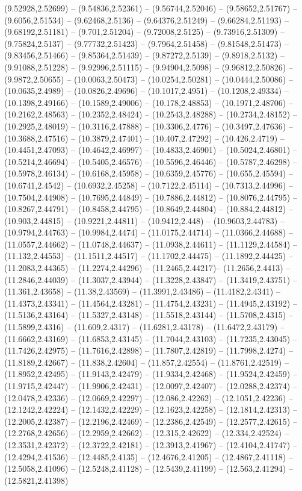 {(9.52928,2.52699) -- (9.54836,2.52361) -- (9.56744,2.52046) -- (9.58652,2.51767) -- (9.6056,2.51534) -- (9.62468,2.5136) -- (9.64376,2.51249) -- (9.66284,2.51193) -- (9.68192,2.51181) -- (9.701,2.51204) -- (9.72008,2.5125) -- (9.73916,2.51309) -- (9.75824,2.5137) -- (9.77732,2.51423) -- (9.7964,2.51458) -- (9.81548,2.51473) -- (9.83456,2.51466) -- (9.85364,2.51439) -- (9.87272,2.5139) -- (9.8918,2.5132) -- (9.91088,2.51228) -- (9.92996,2.51115) -- (9.94904,2.5098) -- (9.96812,2.50826) -- (9.9872,2.50655) -- (10.0063,2.50473) -- (10.0254,2.50281) -- (10.0444,2.50086) -- (10.0635,2.4989) -- (10.0826,2.49696) -- (10.1017,2.4951) -- (10.1208,2.49334) -- (10.1398,2.49166) -- (10.1589,2.49006) -- (10.178,2.48853) -- (10.1971,2.48706) -- (10.2162,2.48563) -- (10.2352,2.48424) -- (10.2543,2.48288) -- (10.2734,2.48152) -- (10.2925,2.48019) -- (10.3116,2.47888) -- (10.3306,2.4776) -- (10.3497,2.47636) -- (10.3688,2.47516) -- (10.3879,2.47401) -- (10.407,2.47292) -- (10.426,2.4719) -- (10.4451,2.47093) -- (10.4642,2.46997) -- (10.4833,2.46901) -- (10.5024,2.46801) -- (10.5214,2.46694) -- (10.5405,2.46576) -- (10.5596,2.46446) -- (10.5787,2.46298) -- (10.5978,2.46134) -- (10.6168,2.45958) -- (10.6359,2.45776) -- (10.655,2.45594) -- (10.6741,2.4542) -- (10.6932,2.45258) -- (10.7122,2.45114) -- (10.7313,2.44996) -- (10.7504,2.44908) -- (10.7695,2.44849) -- (10.7886,2.44812) -- (10.8076,2.44795) -- (10.8267,2.44791) -- (10.8458,2.44795) -- (10.8649,2.44804) -- (10.884,2.44812) -- (10.903,2.44815) -- (10.9221,2.44811) -- (10.9412,2.448) -- (10.9603,2.44783) -- (10.9794,2.44763) -- (10.9984,2.4474) -- (11.0175,2.44714) -- (11.0366,2.44688) -- (11.0557,2.44662) -- (11.0748,2.44637) -- (11.0938,2.44611) -- (11.1129,2.44584) -- (11.132,2.44553) -- (11.1511,2.44517) -- (11.1702,2.44475) -- (11.1892,2.44425) -- (11.2083,2.44365) -- (11.2274,2.44296) -- (11.2465,2.44217)-- (11.2656,2.4413) -- (11.2846,2.44039) -- (11.3037,2.43944) -- (11.3228,2.43847) -- (11.3419,2.43751) -- (11.361,2.43658) -- (11.38,2.43569) -- (11.3991,2.43486) -- (11.4182,2.4341) -- (11.4373,2.43341) -- (11.4564,2.43281) -- (11.4754,2.43231) -- (11.4945,2.43192) -- (11.5136,2.43164) -- (11.5327,2.43148) -- (11.5518,2.43144) -- (11.5708,2.4315) -- (11.5899,2.4316) -- (11.609,2.4317) -- (11.6281,2.43178) -- (11.6472,2.43179) -- (11.6662,2.43169) -- (11.6853,2.43145) -- (11.7044,2.43103) -- (11.7235,2.43045) -- (11.7426,2.42975) -- (11.7616,2.42898) -- (11.7807,2.42819) -- (11.7998,2.4274) -- (11.8189,2.42667) -- (11.838,2.42604) -- (11.857,2.42554) -- (11.8761,2.42519) -- (11.8952,2.42495) -- (11.9143,2.42479) -- (11.9334,2.42468) -- (11.9524,2.42459) -- (11.9715,2.42447) -- (11.9906,2.42431) -- (12.0097,2.42407) -- (12.0288,2.42374) -- (12.0478,2.42336) -- (12.0669,2.42297) -- (12.086,2.42262) -- (12.1051,2.42236) -- (12.1242,2.42224) -- (12.1432,2.42229) -- (12.1623,2.42258) -- (12.1814,2.42313) -- (12.2005,2.42387) -- (12.2196,2.42469) -- (12.2386,2.42549) -- (12.2577,2.42615) -- (12.2768,2.42656) -- (12.2959,2.42662) -- (12.315,2.42622) -- (12.334,2.42524) -- (12.3531,2.42372) -- (12.3722,2.42181) -- (12.3913,2.41967) -- (12.4104,2.41747) -- (12.4294,2.41536) -- (12.4485,2.4135) -- (12.4676,2.41205) -- (12.4867,2.41118) -- (12.5058,2.41096) -- (12.5248,2.41128) -- (12.5439,2.41199) -- (12.563,2.41294) -- (12.5821,2.41398) }
